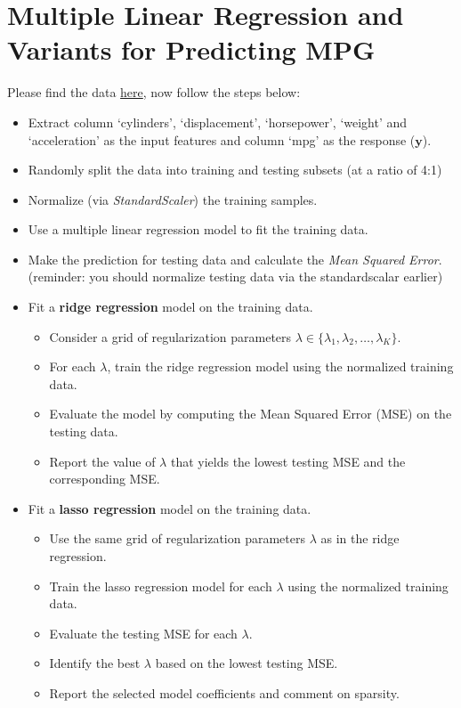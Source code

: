 \documentclass[11pt]{article}
\newcommand{\vct}[1]{\mathbf{#1}}
\def \vy {\vct{y}}
\begin{document}
\section*{Multiple Linear Regression and Variants for Predicting MPG}
 Please find the data \href{https://github.com/selva86/datasets/blob/master/Auto.csv}{here}, now  follow the steps below:
\begin{itemize}
	\item Extract column `cylinders', `displacement', `horsepower', `weight' and `acceleration' as the input features  and column `mpg' as the  response ($\vy$).
	\item Randomly split the data into training and testing subsets (at a ratio of 4:1)
	\item Normalize (via \textit{StandardScaler}) the training samples.
	\item Use a multiple linear regression model to fit the training data.
	\item Make the prediction for testing data and calculate the \textit{Mean Squared Error}. (reminder: you should normalize testing data via the standardscalar earlier)
	\item Fit a \textbf{ridge regression} model on the training data.
	\begin{itemize}
		\item Consider a grid of regularization parameters 
		$\lambda \in \{\lambda_1, \lambda_2, \ldots, \lambda_K\}$.
		\item For each $\lambda$, train the ridge regression model using the normalized training data.
		\item Evaluate the model by computing the Mean Squared Error (MSE) on the testing data.
		\item Report the value of $\lambda$ that yields the lowest testing MSE and the corresponding MSE.
	\end{itemize}
	
	\item Fit a \textbf{lasso regression} model on the training data.
	\begin{itemize}
		\item Use the same grid of regularization parameters $\lambda$ as in the ridge regression.
		\item Train the lasso regression model for each $\lambda$ using the normalized training data.
		\item Evaluate the testing MSE for each $\lambda$.
		\item Identify the best $\lambda$ based on the lowest testing MSE.
		\item Report the selected model coefficients and comment on sparsity.
	\end{itemize}
	

\end{itemize}
\end{document}
